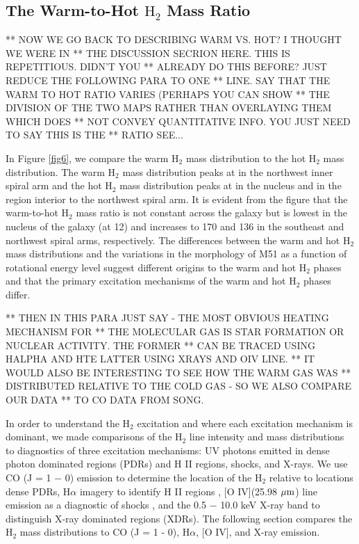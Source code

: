 \documentclass[manuscript]{aastex}
\begin{document}
\subsection{The Warm-to-Hot $\mathrm{H_2}$ Mass Ratio}

** NOW WE GO BACK TO DESCRIBING WARM VS. HOT?  I THOUGHT WE WERE IN
** THE DISCUSSION SECRION HERE. THIS IS REPETITIOUS.  DIDN'T YOU
** ALREADY DO THIS BEFORE?  JUST REDUCE THE FOLLOWING PARA TO ONE
** LINE.  SAY THAT THE WARM TO HOT RATIO VARIES (PERHAPS YOU CAN SHOW
** THE DIVISION OF THE TWO MAPS RATHER THAN OVERLAYING THEM WHICH DOES
** NOT CONVEY QUANTITATIVE INFO.  YOU JUST NEED TO SAY THIS IS THE
** RATIO SEE...

In Figure \ref{fig6}, we compare the warm $\mathrm{H_2}$ mass
distribution to the hot $\mathrm{H_2}$ mass distribution.  The warm
$\mathrm{H_2}$ mass distribution peaks at in the northwest inner
spiral arm and the hot $\mathrm{H_2}$ mass distribution peaks at in
the nucleus and in the region interior to the northwest spiral arm.
It is evident from the figure that the warm-to-hot $\mathrm{H_2}$ mass
ratio is not constant across the galaxy but is lowest in the nucleus
of the galaxy (at 12) and increases to 170 and 136 in the southeast
and northwest spiral arms, respectively.  The differences between the
warm and hot $\mathrm{H_2}$ mass distributions and the variations in
the morphology of M51 as a function of rotational energy level suggest
different origins to the warm and hot $\mathrm{H_2}$ phases and that
the primary excitation mechanisms of the warm and hot $\mathrm{H_2}$
phases differ.
 
** THEN IN THIS PARA JUST SAY - THE MOST OBVIOUS HEATING MECHANISM FOR
** THE MOLECULAR GAS IS STAR FORMATION OR NUCLEAR ACTIVITY. THE FORMER
** CAN BE TRACED USING HALPHA AND HTE LATTER USING XRAYS AND OIV LINE.
** IT WOULD ALSO BE INTERESTING TO SEE HOW THE WARM GAS WAS
** DISTRIBUTED RELATIVE TO THE COLD GAS - SO WE ALSO COMPARE OUR DATA
** TO CO DATA FROM SONG.

In order to understand the $\mathrm{H_2}$ excitation and where each
excitation mechanism is dominant, we made comparisons of the
$\mathrm{H_2}$ line intensity and mass distributions to diagnostics of
three excitation mechanisms: UV photons emitted in dense photon
dominated regions (PDRs) and H II regions, shocks, and X-rays.  We use
CO (J = 1 $-$ 0) emission to determine the location of the
$\mathrm{H_2}$ relative to locations dense PDRs, H$\alpha$ imagery to
identify H II regions \citep{sco01}, [O IV](25.98 $\mbox{$\mu$m}$) line
emission as a diagnostic of shocks \citep{ss99}, and the 0.5 $-$ 10.0
keV X-ray band to distinguish X-ray dominated regions (XDRs).  The
following section compares the $\mathrm{H_2}$ mass distributions to CO
(J = 1 - 0), H$\alpha$, [O IV], and X-ray emission.
\end{document}
